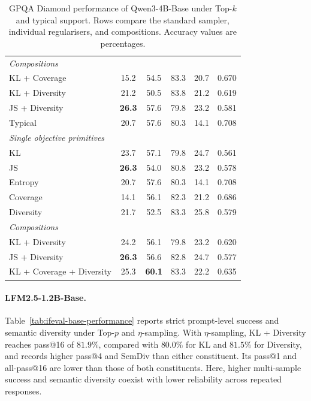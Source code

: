 \documentclass{article} %
\begin{document}
\begin{table}[!htbp]
{\begin{tabular}{lccccc}
\midrule
\multicolumn{6}{l}{\emph{Compositions}} \\
KL + Coverage
& 15.2
& 54.5
& 83.3
& 20.7
& 0.670 \\
KL + Diversity
& 21.2
& 50.5
& 83.8
& 21.2
& 0.619 \\
JS + Diversity
& \textbf{26.3}
& 57.6
& 79.8
& 23.2
& 0.581 \\
\midrule
Typical
& 20.7 & 57.6 & 80.3 & 14.1 & 0.708 \\
\midrule
\multicolumn{6}{l}{\emph{Single objective primitives}} \\
KL
& 23.7 & 57.1 & 79.8 & 24.7 & 0.561 \\
JS
& \textbf{26.3} & 54.0 & 80.8 & 23.2 & 0.578 \\
Entropy
& 20.7 & 57.6 & 80.3 & 14.1 & 0.708 \\
Coverage
& 14.1 & 56.1 & 82.3 & 21.2 & 0.686 \\
Diversity
& 21.7 & 52.5 & 83.3 & 25.8 & 0.579 \\
\midrule
\multicolumn{6}{l}{\emph{Compositions}} \\
KL + Diversity
& 24.2 & 56.1 & 79.8 & 23.2 & 0.620 \\
JS + Diversity
& \textbf{26.3} & 56.6 & 82.8 & 24.7 & 0.577 \\
KL + Coverage + Diversity
& 25.3 & \textbf{60.1} & 83.3 & 22.2 & 0.635 \\

\bottomrule
\end{tabular}%
}
\caption{GPQA Diamond performance of Qwen3-4B-Base under Top-$k$
and typical support. Rows compare the standard sampler, individual
regularisers, and compositions. Accuracy values are percentages.}
\label{tab:gpqa-performance}
\end{table}


\paragraph{LFM2.5-1.2B-Base.}
Table~\ref{tab:ifeval-base-performance} reports strict prompt-level success and semantic diversity under Top-$p$ and $\eta$-sampling.
With $\eta$-sampling, KL + Diversity reaches pass@16 of $81.9\%$, compared with $80.0\%$ for KL and $81.5\%$ for Diversity, and records higher pass@4 and SemDiv than either constituent.
Its pass@1 and all-pass@16 are lower than those of both constituents.
Here, higher multi-sample success and semantic diversity coexist with lower reliability across repeated responses.
\end{document}
